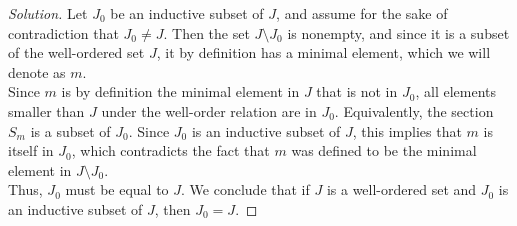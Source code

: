 \documentclass[11pt]{article}
\newenvironment{solution}
  {\renewcommand\qedsymbol{$\blacksquare$}\begin{proof}[Solution]}
  {\end{proof}}
\begin{document}
\begin{solution}
Let $J_0$ be an inductive subset of $J$, and assume for the sake of contradiction that $J_0 \neq J$. Then the set $J \setminus J_0$ is nonempty, and since it is a subset
of the well-ordered set $J$, it by definition has a minimal element, which we will denote as $m$. \\

Since $m$ is by definition the minimal element in $J$ that is not in $J_0$, all elements smaller than $J$ under the well-order relation are in $J_0$. 
Equivalently, the section $S_m$ is a subset of $J_0$. Since $J_0$ is an inductive subset of $J$, this implies that $m$ is itself in $J_0$, which contradicts 
the fact that $m$ was defined to be the minimal element in $J \setminus J_0$. \\

Thus, $J_0$ must be equal to $J$. We conclude that if $J$ is a well-ordered set and $J_0$ is an inductive subset of $J$, then $J_0 = J$.
\end{solution}
\end{document}
